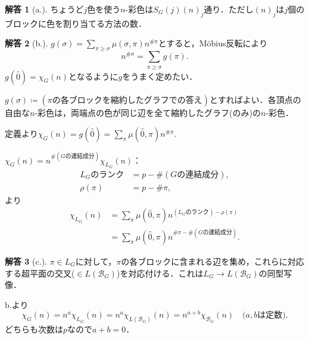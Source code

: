 \documentclass[xelatex,ja=standard,a4paper,14pt,everyparhook=compat]{bxjsarticle}
\newcommand{\mcB}{\mathcal{B}}
\theoremstyle{definition}
\newtheorem*{answer}{解答}
\begin{document}
\begin{answer}[a.]
    ちょうど$j$色を使う$n$-彩色は$S_G(j) (n)_j$通り．ただし$(n)_j$は$j$個のブロックに色を割り当てる方法の数．
\end{answer}

\begin{answer}[b.]
    $g(\sigma) = \sum_{\pi \geq \sigma} \mu(\sigma,\pi) n^{\#\pi}$とすると，M\"obius反転により \begin{equation*}
        n^{\#\sigma} = \sum_{\pi \geq \sigma} g(\pi).
    \end{equation*}
    $g(\hat 0) = \chi_G(n)$となるように$g$をうまく定めたい．
    \newpage

    $g(\sigma) \coloneqq (\text{$\pi$の各ブロックを縮約したグラフでの答え})$とすればよい．各頂点の自由な$n$-彩色は，両端点の色が同じ辺を全て縮約したグラフ(のみ)の$n$-彩色．

    定義より$\chi_G(n) = g(\hat0) = \sum_{\pi} \mu(\hat0,\pi) n^{\#\pi}$.

    $\chi_G(n) = n^{\#(\text{$G$の連結成分})} \chi_{L_G}(n)$： \begin{align*}
        \text{$L_G$のランク} & = p - \#(\text{$G$の連結成分}), \\
        \rho(\pi)            & = p - \#\pi,
    \end{align*}
    より \begin{align*}
        \chi_{L_G}(n)
         & = \sum_\pi \mu(\hat0,\pi) n^{(\text{$L_G$のランク})-\rho(\pi)}  \\
         & = \sum_\pi \mu(\hat0,\pi) n^{\#\pi - \#(\text{$G$の連結成分})}.
    \end{align*}
\end{answer}
\begin{answer}[c.]
    $\pi \in L_G$に対して，$\pi$の各ブロックに含まれる辺を集め，これらに対応する超平面の交叉($\in L(\mcB_G)$)を対応付ける．これは$L_G \to L(\mcB_G)$の同型写像．

    b.より \begin{equation*}
        \chi_G(n) = n^a \chi_{L_G}(n) = n^a \chi_{L(\mcB_G)}(n) = n^{a+b} \chi_{\mcB_G}(n) \quad \text{($a,b$は定数)}.
    \end{equation*}
    どちらも次数は$p$なので$a+b=0$．
\end{answer}
\end{document}
